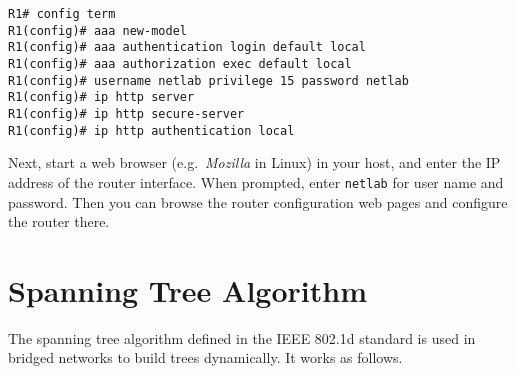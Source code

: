 \documentclass{../UTNetLab}
\begin{document}
    \begin{lstlisting}[language={cisco},emph={netlab}]
R1# config term
R1(config)# aaa new-model
R1(config)# aaa authentication login default local
R1(config)# aaa authorization exec default local
R1(config)# username netlab privilege 15 password netlab
R1(config)# ip http server
R1(config)# ip http secure-server
R1(config)# ip http authentication local
    \end{lstlisting}
    
    Next, start a web browser (e.g.\ \textit{Mozilla} in Linux) in your host, and enter the IP address of the router interface. When prompted, enter \texttt{netlab} for user name and password. Then you can browse the router configuration web pages and configure the router there.


    \newpage
\appendix

\section{Spanning Tree Algorithm}
\label{appendix:spanningTree}
    The spanning tree algorithm defined in the IEEE 802.1d standard is used in bridged networks to build trees dynamically. It works as follows.
\end{document}
